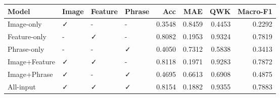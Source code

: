 \begin{tabular}{llllrrrr}
\toprule
Model & Image & Feature & Phrase & Acc & MAE & QWK & Macro-F1 \\
\midrule
Image-only & ✓ & - & - & 0.3548 & 0.8459 & 0.4453 & 0.2292 \\
Feature-only & - & ✓ & - & 0.8082 & 0.1953 & 0.9324 & 0.7819 \\
Phrase-only & - & - & ✓ & 0.4050 & 0.7312 & 0.5838 & 0.3413 \\
Image+Feature & ✓ & ✓ & - & 0.8118 & 0.1971 & 0.9283 & 0.7872 \\
Image+Phrase & ✓ & - & ✓ & 0.4695 & 0.6613 & 0.6908 & 0.4875 \\
All-input & ✓ & ✓ & ✓ & 0.8154 & 0.1882 & 0.9355 & 0.7883 \\
\bottomrule
\end{tabular}

